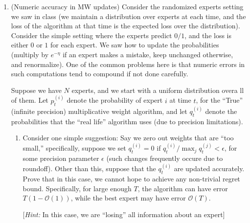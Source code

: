 \documentclass[12pt]{article}
\newcommand{\BigO}[1]{\mathcal{O}\left( #1 \right)}
\begin{document}
\begin{enumerate}
\begin{enumerate}

      {\bf Solution:}

\item Pick $n = 100$ random points in $[-1, 1]^{2}$ (uniformly), and run SGD for fixed $\eta = 1/2$, as above. Write down what the distance to optimum is, after $T = \{ 10, 100, 1000\}$ iterations (if you want to be careful, you should average over $5$ random choices for the initialization). Now consider dropping the step size $\eta_{t} = 1/t$, and write down the result for $T$ as above.

      {\bf Solution:}

\end{enumerate}

\item (Numeric accuracy in MW updates) Consider the randomized experts setting we saw in class (we maintain a distribution over experts at each time, and the loss of the algorithm at that time is the expected loss over the distribution). Consider the simple setting where the experts predict $0/1$, and the loss is either $0$ or $1$ for each expert. We saw how to update the probabilities (multiply by $e^{-\eta}$ if an expert makes a mistake, keep unchanged otherwise, and renormalize). One of the common problems here is that numeric errors in such computations tend to compound if not done carefully.

Suppose we have $N$ experts, and we start with a uniform distribution overa ll of them. Let $p_{t}^{(i)}$ denote the probability of expert $i$ at time $t$, for the ``True'' (infinite precision) multiplicative weight algorithm, and let $q_{t}^{(i)}$ denote the probabilities that the ``real life'' algorithm uses (due to precision limitations).

\begin{enumerate}
  \item Consider one simple suggestion: Say we zero out weights that are ``too small,'' specifically, suppose we set $q_{t}^{(i)} = 0$ if $q_{t}^{(i)}/\max_{j}q_{t}^{(j)} < \epsilon$, for some precision parameter $\epsilon$ (such changes frequently occure due to roundoff). Other than this, suppose that the $q_{t}^{(i)}$ are updated accurately. Prove that in this case, we cannot hope to achieve any non-trivial regret bound. Specifically, for large enough $T$, the algorithm can have error $T(1 - \BigO{1})$, while the best expert may have error $\BigO{T}$.

[{\em Hint:} In this case, we are ``losing'' all information about an expert]


\end{enumerate}
\end{enumerate}
\end{document}
